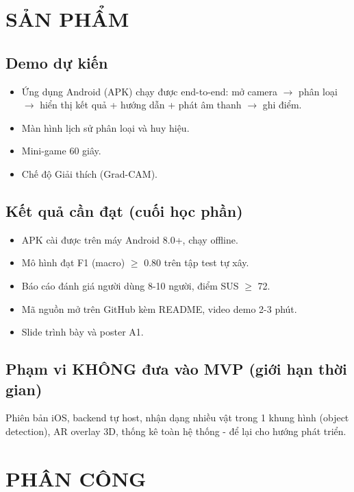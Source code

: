 \documentclass[13pt,a4paper,oneside]{report}
\begin{document}
\chapter{SẢN PHẨM}

\section{Demo dự kiến}

\begin{itemize}[leftmargin=1.5cm]
    \item Ứng dụng Android (APK) chạy được end-to-end: mở camera $\rightarrow$ phân loại $\rightarrow$ hiển thị kết quả + hướng dẫn + phát âm thanh $\rightarrow$ ghi điểm.
    \item Màn hình lịch sử phân loại và huy hiệu.
    \item Mini-game 60 giây.
    \item Chế độ Giải thích (Grad-CAM).
\end{itemize}

\section{Kết quả cần đạt (cuối học phần)}

\begin{itemize}[leftmargin=1.5cm]
    \item APK cài được trên máy Android 8.0+, chạy offline.
    \item Mô hình đạt F1 (macro) $\geq$ 0.80 trên tập test tự xây.
    \item Báo cáo đánh giá người dùng 8-10 người, điểm SUS $\geq$ 72.
    \item Mã nguồn mở trên GitHub kèm README, video demo 2-3 phút.
    \item Slide trình bày và poster A1.
\end{itemize}

\section{Phạm vi KHÔNG đưa vào MVP (giới hạn thời gian)}

Phiên bản iOS, backend tự host, nhận dạng nhiều vật trong 1 khung hình (object detection), AR overlay 3D, thống kê toàn hệ thống - để lại cho hướng phát triển.

\chapter{PHÂN CÔNG}
\end{document}

